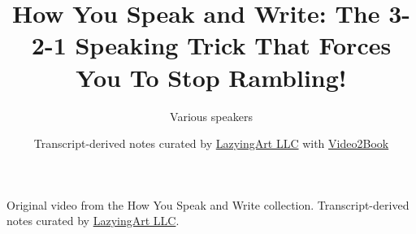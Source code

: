 \documentclass[11pt,oneside]{book}
\begin{document}
\frontmatter
\title{How You Speak and Write: The 3-2-1 Speaking Trick That Forces You To Stop Rambling!}
\author{Various speakers}
\date{Transcript-derived notes curated by \href{https://lazying.art}{LazyingArt LLC} with \href{https://github.com/lachlanchen/Video2Book}{Video2Book}}
\maketitle
\begin{center}
\small Original video from the How You Speak and Write collection. Transcript-derived notes curated by \href{https://lazying.art}{LazyingArt LLC}.
\end{center}
\clearpage
\mainmatter

\end{document}
